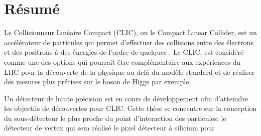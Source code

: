 \chapter*{Résumé}

Le Collisionneur Linéaire Compact (CLIC), ou le Compact Linear
Collider, est un accélérateur de particules qui permet d'effectuer des
collisions entre des électrons et des positrons à des énergies de
l'ordre de quelques \tev. Le CLIC, est considéré comme une des options
qui pourrait être complémentaire aux expériences du LHC pour la
découverte de la physique au-delà du modèle standard et de réaliser
des mesures plus précises sur le boson de Higgs par exemple.

Un détecteur de haute précision est en cours de développement afin
d'atteindre les objectifs de découvertes pour CLIC. Cette thèse se
concentre sur la conception du sous-détecteur le plus proche du point
d'interaction des particules: le détecteur de vertex qui sera réalisé le pixel
détecteur à silicium pour
